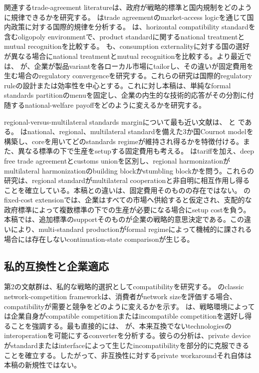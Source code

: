 関連するtrade-agreement literatureは、政府が戦略的標準と国内規制をどのように規律できるかを研究する。\citet{bagwellStaiger2001} はtrade agreementのmarket-access logicを通じて国内政策に対する国際的規律を分析する。\citet{costinot2008} は、horizontal compatibility standardを含むoligopoly environmentで、product standardに関するnational treatmentとmutual recognitionを比較する。\citet{geng2019} も、consumption externalityに対する国の選好が異なる場合にnational treatmentとmutual recognitionを比較する。より最近では、\citet{grossmanMcCalmanStaiger2021} が、企業が製品variantを各ローカル市場にtailorし、その違いが固定費用を生む場合のregulatory convergenceを研究する。これらの研究は国際的regulatory ruleの設計または効率性を中心とする。これに対し本稿は、単純なformal standards partitionのmenuを固定し、企業の内生的な技術的応答がその分割に付随するnational-welfare payoffをどのように変えるかを研究する。

regional-versus-multilateral standards marginについて最も近い文献は、\citet{takaradaEtAl2020} と \citet{kawabataTakarada2021} である。\citet{takaradaEtAl2020} はnational、regional、multilateral standardを備えた3か国Cournot modelを構築し、coreを用いてどのstandards regimeが維持され得るかを特徴付ける。また、異なる標準の下で生産をsetupする固定費用も考える。\citet{kawabataTakarada2021} はtariffを加え、deep free trade agreementとcustoms unionを区別し、regional harmonizationがmultilateral harmonizationのbuilding blockかstumbling blockかを問う。これらの研究は、regional standardがmultilateral cooperationと非自明に相互作用し得ることを確立している。本稿との違いは、固定費用そのものの存在ではない。\citet{takaradaEtAl2020} のfixed-cost extensionでは、企業はすべての市場へ供給すると仮定され、支配的な政府標準によって複数標準の下での生産が必要になる場合にsetup costを負う。本稿では、追加標準のsupportそのものが企業の戦略的意思決定である。この違いにより、multi-standard productionがformal regimeによって機械的に課される場合には存在しないcontinuation-state comparisonが生じる。

\subsection{私的互換性と企業適応}
\label{subsec:lit-private-compatibility}

第2の文献群は、私的な戦略的選択としてcompatibilityを研究する。\citet{katzShapiro1985} のclassic network-competition frameworkは、消費者がnetwork sizeを評価する場合、compatibilityが需要と競争をどのように変えるかを示す。\citet{besenFarrell1994} は、戦略環境によっては企業自身がcompatible competitionまたはincompatible competitionを選好し得ることを強調する。最も直接的には、\citet{farrellSaloner1992} が、本来互換でないtechnologiesのinteroperationを可能にするconverterを分析する。彼らの分析は、private deviceがstandardまたはinterfaceによって生じたincompatibilityを部分的に克服できることを確立する。したがって、非互換性に対するprivate workaroundそれ自体は本稿の新規性ではない。

